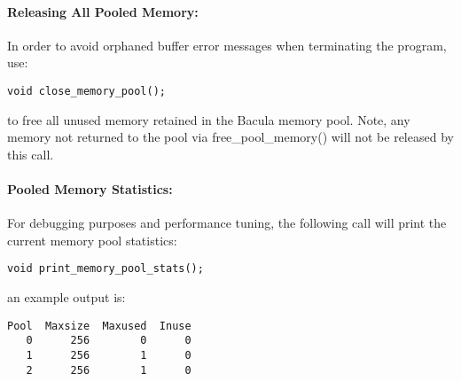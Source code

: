 \paragraph*{Releasing All Pooled Memory:}

In order to avoid orphaned buffer error messages when terminating the program,
use: 

\footnotesize
\begin{verbatim}
void close_memory_pool();
\end{verbatim}
\normalsize

to free all unused memory retained in the Bacula memory pool. Note, any memory
not returned to the pool via free\_pool\_memory() will not be released by this
call. 

\paragraph*{Pooled Memory Statistics:}

For debugging purposes and performance tuning, the following call will print
the current memory pool statistics: 

\footnotesize
\begin{verbatim}
void print_memory_pool_stats();
\end{verbatim}
\normalsize

an example output is: 

\footnotesize
\begin{verbatim}
Pool  Maxsize  Maxused  Inuse
   0      256        0      0
   1      256        1      0
   2      256        1      0
\end{verbatim}
\normalsize
